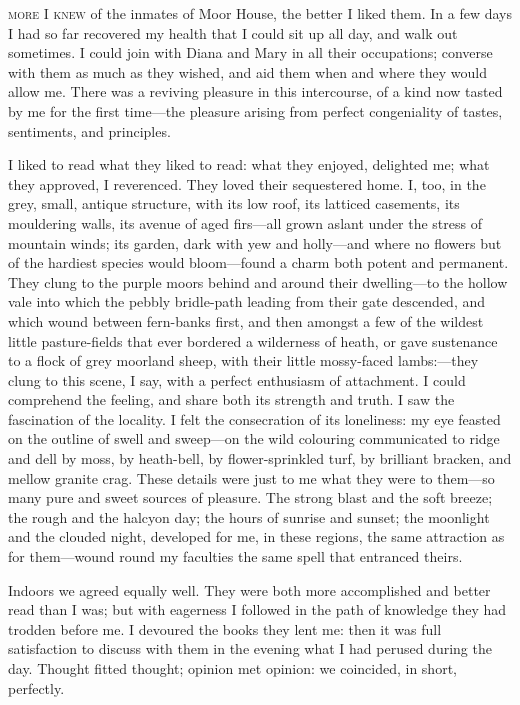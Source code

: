 
 \textsc{more I knew} of the inmates of Moor House, the better I liked them.
In a few days I had so far recovered my health that I could sit up all
day, and walk out sometimes. I could join with Diana and Mary in all
their occupations; converse with them as much as they wished, and aid
them when and where they would allow me. There was a reviving pleasure
in this intercourse, of a kind now tasted by me for the first time---the
pleasure arising from perfect congeniality of tastes, sentiments, and
principles.

I liked to read what they liked to read: what they enjoyed, delighted
me; what they approved, I reverenced. They loved their sequestered
home. I, too, in the grey, small, antique structure, with its low roof,
its latticed casements, its mouldering walls, its avenue of aged
firs---all grown aslant under the stress of mountain winds; its garden,
dark with yew and holly---and where no flowers but of the hardiest
species would bloom---found a charm both potent and permanent. They
clung to the purple moors behind and around their dwelling---to the
hollow vale into which the pebbly bridle-path leading from their gate
descended, and which wound between fern-banks first, and then amongst a
few of the wildest little pasture-fields that ever bordered a wilderness
of heath, or gave sustenance to a flock of grey moorland sheep, with
their little mossy-faced lambs:---they clung to this scene, I say, with
a perfect enthusiasm of attachment. I could comprehend the feeling, and
share both its strength and truth. I saw the fascination of the
locality. I felt the consecration of its loneliness: my eye feasted on
the outline of swell and sweep---on the wild colouring communicated to
ridge and dell by moss, by heath-bell, by flower-sprinkled turf, by
brilliant bracken, and mellow granite crag. These details were just to
me what they were to them---so many pure and sweet sources of pleasure.
The strong blast and the soft breeze; the rough and the halcyon day; the
hours of sunrise and sunset; the moonlight and the clouded night,
developed for me, in these regions, the same attraction as for
them---wound round my faculties the same spell that entranced theirs.

Indoors we agreed equally well. They were both more accomplished and
better read than I was; but with eagerness I followed in the path of
knowledge they had trodden before me. I devoured the books they lent
me: then it was full satisfaction to discuss with them in the evening
what I had perused during the day. Thought fitted thought; opinion met
opinion: we coincided, in short, perfectly.

